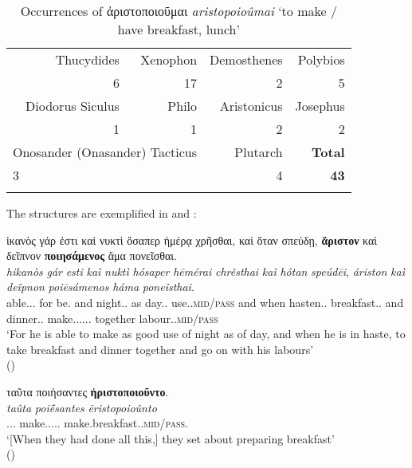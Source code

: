 \documentclass[output=paper,colorlinks,citecolor=brown]{langscibook}
\begin{document}
\begin{table}[h]
	\caption{Occurrences of ἀριστοποιοῦμαι \textit{aristopoioûmai} `to make / have breakfast, lunch'}
	\label{tab:H:occurrences-aristopoioumai}
	\begin{tabular}{rrrr}
    \lsptoprule
		Thucydides & Xenophon & Demosthenes & Polybios  \\
		6   & 17 & 2  & 5 \\
        Diodorus Siculus & Philo & Aristonicus & Josephus  \\
        1& 1   & 2          & 2  \\
        \multicolumn{2}{l}{Onosander (Onasander) Tacticus} & Plutarch & \textbf{Total} \\
        \multicolumn{2}{l}{3}    & 4 & \textbf{43} \\
    \lspbottomrule
	\end{tabular}
\end{table}

The structures are exemplified in  and :


\ea \label{ex:18}
\glll ἱκανὸς		γάρ     ἐστι        καὶ	νυκτὶ 		ὅσαπερ	ἡμέρᾳ		χρῆσθαι, καὶ	ὅταν	σπεύδῃ,	\textbf{ἄριστον}	 καὶ 	δεῖπνον	\textbf{ποιησάμενος} ἅμα 		πονεῖσθαι.\\
\textit{hikanòs}	\textit{gár}      \textit{esti}         \textit{kaì}	\textit{nuktì} 		\textit{hósaper}	\textit{hēmérai}	\textit{chrêsthai} \textit{kaì}	\textit{hótan}	\textit{speúdēi},	\textit{áriston}		 \textit{kaì}	\textit{deîpnon}	\textit{poiēsámenos} \textit{háma}		\textit{poneîsthai}.\\
able.\Nom{}.\M{}.\Sg{}	for      be.\Tsg{}    and	night.\Dat{}.\F{}	as		day.\Dat{}.\F{}	use.\Inf{}.\textsc{mid/pass} and	when	hasten.\Sbjv{}.\Tsg{}	breakfast.\Acc{}.\N{}	 and	dinner.\Acc{}.\N{}	make.\Aor{}.\Ptcp{}.\Mid{}.\Nom{}.\M{}.\Sg{} together 	labour.\Inf{}.\textsc{mid/pass}\\
\glt `For he is able to make as good use of night as of day, and when he is in haste, to take breakfast and dinner together and go on with his labours' \\
\hspace*{\fill}()
\z

\ea \label{ex:19}
\glll ταῦτα		ποιήσαντες			\textbf{ἠριστοποιοῦντο}.\\
\textit{taûta}		\textit{poiḗsantes}			\textit{ēristopoioûnto}\\
\Dem{}.\Acc{}.\N{}.\Pl{} make.\Aor{}.\Ptcp{}.\Nom{}.\M{}.\Pl{} make.breakfast.\Impf{}.\textsc{mid/pass}.\Tpl{}\\
\glt `[When they had done all this,] they set about preparing breakfast' \\
\hspace*{\fill}()
\z
\end{document}
